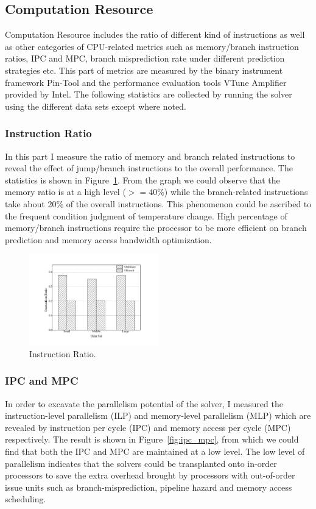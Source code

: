 \subsection{Computation Resource}
\label{sec:computation}
Computation Resource includes the ratio of different kind of instructions as well as other categories of CPU-related metrics such as memory/branch instruction ratios, IPC and MPC, branch misprediction rate under different prediction strategies etc. This part of metrics are measured by the binary instrument framework Pin-Tool and the performance evaluation tools VTune Amplifier provided by Intel. The following statistics are collected by running the solver using the different data sets except where noted.
\subsubsection{Instruction Ratio}
In this part I measure the ratio of memory and branch related instructions to reveal the effect of jump/branch instructions to the overall performance. The statistics is shown in Figure~\ref{fig:ratio}. From the graph we could observe that the memory ratio is at a high level ($>=40\%$) while the branch-related instructions take about 20\% of the overall instructions. This phenomenon could be ascribed to the frequent condition judgment of temperature change. High percentage of memory/branch instructions require the processor to be more efficient on branch prediction and memory access bandwidth optimization.

\begin{figure}[ht]
\centering
\includegraphics[width=0.50\textwidth]{graph/ins_ratio.pdf}
\caption{Instruction Ratio.}
\label{fig:ratio}
\end{figure}

\subsubsection{IPC and MPC}
In order to excavate the parallelism potential of the \SA solver, I measured the instruction-level parallelism (ILP) and memory-level parallelism (MLP) which are revealed by instruction per cycle (IPC) and memory access per cycle (MPC) respectively. The result is shown in Figure~\ref{fig:ipc_mpc}, from which we could find that both the IPC and MPC are maintained at a low level. The low level of parallelism indicates that the \SA solvers could be transplanted onto in-order processors to save the extra overhead brought by processors with out-of-order issue units such as branch-misprediction, pipeline hazard and memory access scheduling.


